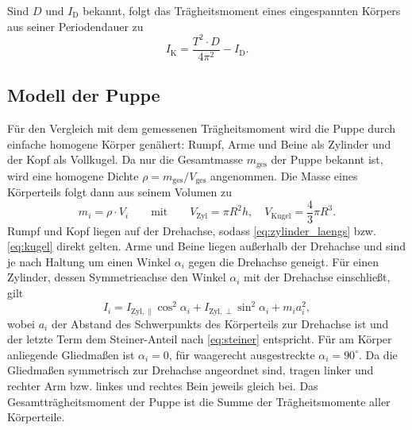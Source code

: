 Sind $D$ und $I_\text{D}$ bekannt, folgt das Trägheitsmoment eines eingespannten Körpers aus seiner Periodendauer zu
\begin{equation}
    I_\text{K} = \frac{T^2 \cdot D}{4\pi^2} - I_\text{D} .
    \label{eq:IK}
\end{equation}

\subsection{Modell der Puppe}
\label{sec:puppe}

Für den Vergleich mit dem gemessenen Trägheitsmoment wird die Puppe durch einfache homogene Körper genähert:
Rumpf, Arme und Beine als Zylinder und der Kopf als Vollkugel.
Da nur die Gesamtmasse $m_\text{ges}$ der Puppe bekannt ist, wird eine homogene Dichte
$\rho = m_\text{ges} / V_\text{ges}$ angenommen. Die Masse eines Körperteils folgt dann aus seinem Volumen zu
\begin{equation}
    m_i = \rho \cdot V_i \qquad \text{mit} \qquad V_\text{Zyl} = \pi R^2 h , \quad V_\text{Kugel} = \frac{4}{3} \pi R^3 .
    \label{eq:masse_teil}
\end{equation}
Rumpf und Kopf liegen auf der Drehachse, sodass \autoref{eq:zylinder_laengs} bzw. \autoref{eq:kugel} direkt gelten.
Arme und Beine liegen außerhalb der Drehachse und sind je nach Haltung um einen Winkel $\alpha_i$
gegen die Drehachse geneigt. Für einen Zylinder, dessen Symmetrieachse den Winkel $\alpha_i$ mit der Drehachse einschließt, gilt
\begin{equation}
    I_i = I_{\text{Zyl},\parallel} \cos^2\alpha_i + I_{\text{Zyl},\perp} \sin^2\alpha_i + m_i a_i^2 ,
    \label{eq:zylinder_schraeg}
\end{equation}
wobei $a_i$ der Abstand des Schwerpunkts des Körperteils zur Drehachse ist und der letzte Term dem Steiner-Anteil nach \autoref{eq:steiner} entspricht.
Für am Körper anliegende Gliedmaßen ist $\alpha_i = 0$, für waagerecht ausgestreckte $\alpha_i = 90^\circ$.
Da die Gliedmaßen symmetrisch zur Drehachse angeordnet sind, tragen linker und rechter Arm bzw. linkes und rechtes Bein jeweils gleich bei.
Das Gesamtträgheitsmoment der Puppe ist die Summe der Trägheitsmomente aller Körperteile.